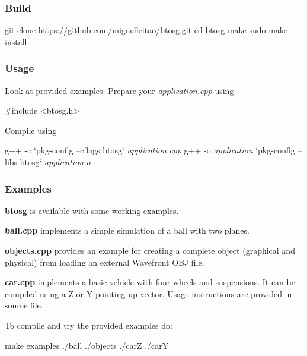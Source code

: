 \subsubsection*{Build}

\begin{DoxyVerb}git clone https://github.com/miguelleitao/btosg.git
cd btosg
make
sudo make install
\end{DoxyVerb}


\subsubsection*{Usage}

Look at provided examples. Prepare your {\itshape application.\+cpp} using \begin{DoxyVerb}#include <btosg.h>
\end{DoxyVerb}


Compile using 
\begin{DoxyPre}
g++ -c `pkg-config --cflags btosg` {\itshape application.cpp}
g++ -o {\itshape application} `pkg-config --libs btosg` {\itshape application.o}
\end{DoxyPre}
 \subsubsection*{Examples}

{\bfseries btosg} is available with some working examples.
\begin{DoxyItemize}
\item {\bfseries ball.\+cpp} implements a simple simulation of a ball with two planes.
\item {\bfseries objects.\+cpp} provides an example for creating a complete object (graphical and physical) from loading an external Wavefront O\+BJ file.
\item {\bfseries car.\+cpp} implements a basic vehicle with four wheels and suspensions. It can be compiled using a Z or Y pointing up vector. Usage instructions are provided in source file.
\end{DoxyItemize}

To compile and try the provided examples do\+: \begin{DoxyVerb}make examples 
./ball
./objects
./carZ
./carY\end{DoxyVerb}
 